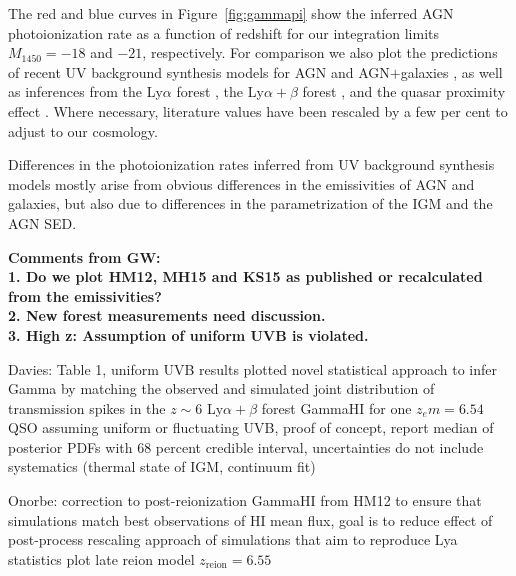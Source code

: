 \documentclass[fleqn,usenatbib]{mnras}
\begin{document}
The red and blue curves in Figure~\ref{fig:gammapi} show the inferred AGN  photoionization rate as a function of redshift for our integration limits $M_{1450}=-18$ and $-21$, respectively. For comparison we also plot the predictions of recent UV background synthesis models for AGN \citep{2012ApJ...746..125H,2015ApJ...813L...8M,2015MNRAS.451L..30K} and AGN$+$galaxies \citep{2012ApJ...746..125H,2018arXiv180104931P}, as well as inferences from the  Ly$\alpha$ forest \citep{2011MNRAS.412.1926W,2013MNRAS.436.1023B,2017MNRAS.467.3172G,2018MNRAS.473..560D}, the Ly$\alpha+\beta$ forest \citep{2018ApJ...855..106D}, and the quasar proximity effect \citep{2011MNRAS.412.2543C}. 
Where necessary, literature values have been rescaled by a few per cent to adjust to our cosmology.

Differences in the  photoionization rates inferred from UV background synthesis models mostly arise from obvious differences in the emissivities of AGN and galaxies, but also due to differences in the parametrization of the IGM and the AGN SED. 


\textbf{Comments from GW:\\
1. Do we plot HM12, MH15 and KS15 as published or recalculated from the emissivities?\\
2. New forest measurements need discussion.\\
3. High z: Assumption of uniform UVB is violated.
}





Davies: Table 1, uniform UVB results plotted
novel statistical approach to infer Gamma by matching the observed and simulated joint distribution of transmission spikes in the $z\sim 6$ Ly$\alpha+\beta$ forest
GammaHI for one $z_em=6.54$QSO assuming uniform or fluctuating UVB, proof of concept,
report median of posterior PDFs with 68 percent credible interval, uncertainties do not include systematics (thermal state of IGM, continuum fit)

Onorbe:
correction to post-reionization GammaHI from HM12 to ensure that simulations match best observations of HI mean flux, goal is to reduce effect of post-process rescaling approach of simulations that aim to reproduce Lya statistics
plot late reion model $z_\mathrm{reion}=6.55$
\end{document}
